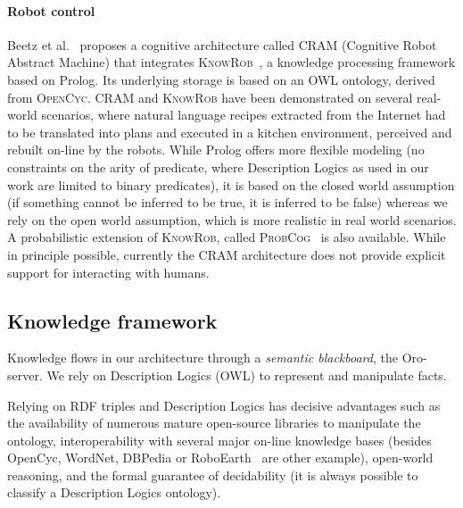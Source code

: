 \documentclass[preprint,5p]{elsarticle}
\begin{document}

\paragraph{Robot control}


Beetz et al.~\cite{Beetz2010} proposes a cognitive architecture called
\textsc{CRAM} (Cognitive Robot Abstract Machine) that integrates
\textsc{KnowRob}~\cite{Tenorth2009a}, a knowledge processing framework based on
Prolog. Its underlying storage is based on an OWL ontology, derived from
\textsc{OpenCyc}. \textsc{CRAM} and \textsc{KnowRob} have been demonstrated on
several real-world scenarios, where natural language recipes extracted from the
Internet had to be translated into plans and executed in a kitchen environment,
perceived and rebuilt on-line by the robots. While Prolog offers more flexible
modeling (no constraints on the arity of predicate, where Description Logics as
used in our work are limited to binary predicates), it is based on the closed
world assumption (if something cannot be inferred to be true, it is inferred to
be false) whereas we rely on the open world assumption, which is more realistic
in real world scenarios. A probabilistic extension of \textsc{KnowRob}, called
\textsc{ProbCog}~\cite{Jain2009} is also available. While in principle
possible, currently the CRAM architecture does not provide explicit support for
interacting with humans.


\subsection{Knowledge framework}
\label{krs-discussion}

Knowledge flows in our architecture through a \emph{semantic blackboard}, the
{\sc Oro}-server. We rely on Description Logics (OWL) to represent and
manipulate facts.

Relying on RDF triples and Description Logics has decisive advantages such as
the availability of numerous mature open-source libraries to manipulate the
ontology, interoperability with several major on-line knowledge bases (besides
{\sc OpenCyc}, {\sc WordNet}, {\sc DBPedia} or {\sc
RoboEarth}~\cite{Waibel2011} are other example), open-world reasoning, and the
formal guarantee of decidability (it is always possible to classify a
Description Logics ontology).
\end{document}
